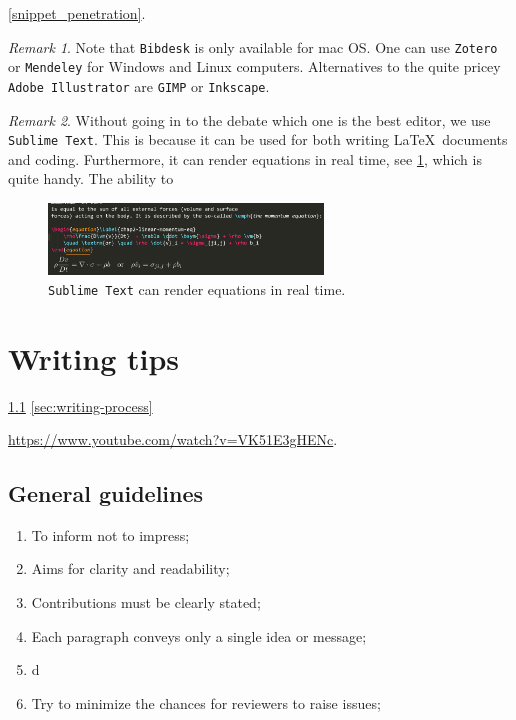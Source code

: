 \documentclass[authoryear,3p,times,preprint,review,fleqn]{elsarticle}
\numberwithin{equation}{section}
\theoremstyle{remark}
\newtheorem{rmk}{Remark}
\begin{document}
\cref{snippet_penetration}.

\begin{rmk}
Note that \texttt{Bibdesk} is only available for mac OS. One can use \texttt{Zotero} or \texttt{Mendeley} for Windows and Linux computers. Alternatives to the quite pricey  \texttt{Adobe Illustrator} are \texttt{GIMP} or \texttt{Inkscape}.
\end{rmk}

\begin{rmk}
Without going in to the debate which one is the best editor, we use \texttt{Sublime Text}. This is
 because it can be used for both writing \LaTeX\ documents and coding. Furthermore, it can render equations in real time, see  \cref{fig:sublime-text}, which is quite handy. The ability to 

\begin{figure}[h!]
  \centering 
   \includegraphics[width=0.65\textwidth]{sublime-text}
   \caption{\texttt{Sublime Text} can render equations in real time.}
\label{fig:sublime-text}
\end{figure}
\end{rmk}


\section{Writing tips}\label{sec:writing-tips}

\cref{sec:guidelines}
\cref{sec:writing-process}

\url{https://www.youtube.com/watch?v=VK51E3gHENc}.

\subsection{General guidelines}\label{sec:guidelines}

\begin{enumerate}
\item To inform not to impress;
\item Aims for clarity and readability;
\item Contributions must be clearly stated;
\item Each paragraph conveys only a single idea or message;
\item d 
\item Try to minimize the chances for reviewers to raise issues;
\end{enumerate}
\end{document}
